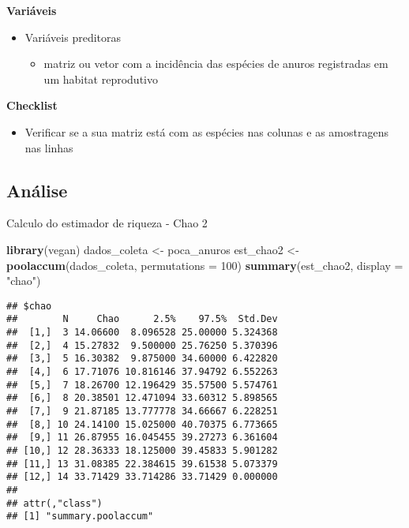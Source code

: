 \documentclass[
]{book}
\newenvironment{Shaded}{\begin{snugshade}}{\end{snugshade}}
\newcommand{\DataTypeTok}[1]{\textcolor[rgb]{0.13,0.29,0.53}{#1}}
\newcommand{\DecValTok}[1]{\textcolor[rgb]{0.00,0.00,0.81}{#1}}
\newcommand{\KeywordTok}[1]{\textcolor[rgb]{0.13,0.29,0.53}{\textbf{#1}}}
\newcommand{\NormalTok}[1]{#1}
\newcommand{\StringTok}[1]{\textcolor[rgb]{0.31,0.60,0.02}{#1}}
\providecommand{\tightlist}{%
  \setlength{\itemsep}{0pt}\setlength{\parskip}{0pt}}
\begin{document}
\textbf{Variáveis}

\begin{itemize}
\tightlist
\item
  Variáveis preditoras

  \begin{itemize}
  \tightlist
  \item
    matriz ou vetor com a incidência das espécies de anuros registradas em um habitat reprodutivo
  \end{itemize}
\end{itemize}

\textbf{Checklist}

\begin{itemize}
\tightlist
\item
  Verificar se a sua matriz está com as espécies nas colunas e as amostragens nas linhas
\end{itemize}

\hypertarget{anuxe1lise-2}{%
\subsection{Análise}\label{anuxe1lise-2}}

Calculo do estimador de riqueza - Chao 2

\begin{Shaded}
\begin{Highlighting}[]
\KeywordTok{library}\NormalTok{(vegan)}
\NormalTok{dados_coleta <-}\StringTok{ }\NormalTok{poca_anuros}
\NormalTok{est_chao2 <-}\StringTok{ }\KeywordTok{poolaccum}\NormalTok{(dados_coleta, }\DataTypeTok{permutations =} \DecValTok{100}\NormalTok{)}
\KeywordTok{summary}\NormalTok{(est_chao2, }\DataTypeTok{display =} \StringTok{"chao"}\NormalTok{)}
\end{Highlighting}
\end{Shaded}

\begin{verbatim}
## $chao
##        N     Chao      2.5%    97.5%  Std.Dev
##  [1,]  3 14.06600  8.096528 25.00000 5.324368
##  [2,]  4 15.27832  9.500000 25.76250 5.370396
##  [3,]  5 16.30382  9.875000 34.60000 6.422820
##  [4,]  6 17.71076 10.816146 37.94792 6.552263
##  [5,]  7 18.26700 12.196429 35.57500 5.574761
##  [6,]  8 20.38501 12.471094 33.60312 5.898565
##  [7,]  9 21.87185 13.777778 34.66667 6.228251
##  [8,] 10 24.14100 15.025000 40.70375 6.773665
##  [9,] 11 26.87955 16.045455 39.27273 6.361604
## [10,] 12 28.36333 18.125000 39.45833 5.901282
## [11,] 13 31.08385 22.384615 39.61538 5.073379
## [12,] 14 33.71429 33.714286 33.71429 0.000000
## 
## attr(,"class")
## [1] "summary.poolaccum"
\end{verbatim}
\end{document}
